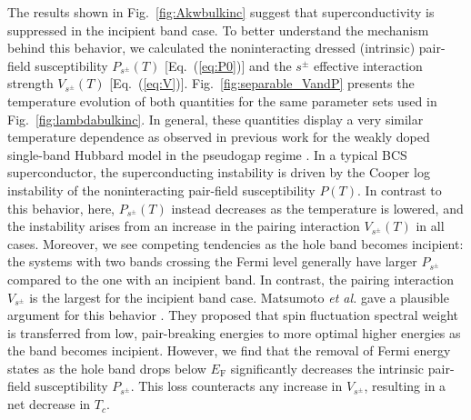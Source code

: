 \documentclass[prb,twocolumn,amsmath,amssymb,superscriptaddress,floatfix,nofootinbib]{revtex4-2}
\begin{document}
The results shown in Fig.~\ref{fig:Akwbulkinc} suggest that superconductivity is suppressed in the incipient band case. To better understand the mechanism behind this behavior, we calculated the noninteracting dressed (intrinsic) pair-field susceptibility $P_{s^\pm}(T)$ [Eq.~(\ref{eq:P0})] and the $s^\pm$ effective interaction strength $V_{s^\pm}(T)$ [Eq.~(\ref{eq:V})]. Fig.~\ref{fig:separable_VandP} presents the temperature evolution of both quantities for the same parameter sets used in Fig.~\ref{fig:lambdabulkinc}. 
In general, these quantities display a very similar temperature dependence as observed in previous work for the weakly doped single-band Hubbard model in the pseudogap regime \cite{Maier2016}. In a typical BCS superconductor, the superconducting instability is driven by the Cooper log instability of the noninteracting pair-field susceptibility $P(T)$. In contrast to this behavior, here, $P_{s^\pm}(T)$ instead decreases as the temperature is lowered, and the instability arises from an increase in the pairing interaction $V_{s^\pm}(T)$ in all cases.  Moreover, we see competing tendencies as the hole band becomes incipient: the systems with two bands crossing the Fermi level generally have larger $P_{s^\pm}$ compared to the one with an incipient band. In contrast, the pairing interaction $V_{s^\pm}$ is the largest for the incipient band case. Matsumoto {\it et al.} gave a plausible argument for this behavior  \cite{KurokiFlex2020}. They proposed that spin fluctuation spectral weight is transferred from low, pair-breaking energies to more optimal higher energies as the band becomes incipient. However, we find that the removal of Fermi energy states as the hole band drops below $E_\mathrm{F}$ significantly decreases the intrinsic pair-field susceptibility $P_{s^\pm}$. This loss counteracts any increase in $V_{s^\pm}$, resulting in a net decrease in $T_c$.  
\end{document}
